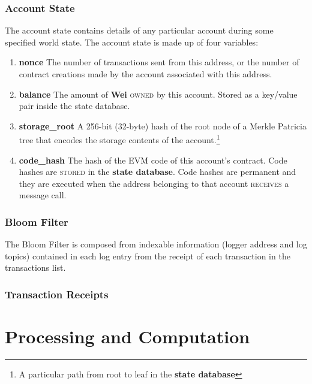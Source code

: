 \documentclass[10pt,a4paper,leqno,bibliography=totoc]{scrartcl}
\newenvironment{alphafootnotes}
{\par\edef\savedfootnotenumber{\number\value{footnote}}
\renewcommand{\thefootnote}{\alph{footnote}}
\setcounter{footnote}{0}}
{\par\setcounter{footnote}{\savedfootnotenumber}}
\begin{document}
\begin{alphafootnotes}
\begin{multicols*}{2}
					\subsubsection{Account State}
				The account state contains details of any particular account during some specified world state. The account state is made up of four variables:
				\begin{enumerate}
					\item \textbf{nonce} The number of transactions sent from this address, or the number of contract creations made by the account associated with this address.
					\item \textbf{balance} The amount of \textbf{Wei} \textsc{owned} by this account. Stored as a key/value pair inside the state database. 
					\item \textbf{storage\_root} A 256-bit (32-byte) hash of the root node of a Merkle Patricia tree that encodes the storage contents of the account.\footnote{A particular path from root to leaf in the \textbf{\gls{state database}}} 
					\item \textbf{code\_hash} The hash of the EVM code of this account's contract. Code hashes are \textsc{stored} in the \textbf{\gls{state database}}. Code hashes are permanent and they are executed when the address belonging to that account \textsc{receives} a message call.

				\end{enumerate}

    					\subsubsection{Bloom Filter}
				The Bloom Filter is composed from indexable information (logger address and log topics) contained in each log entry from the receipt of each transaction in the transactions list. 

					\subsubsection{Transaction Receipts}


		\section{Processing and Computation}
	

\end{multicols*}
\end{alphafootnotes}
\end{document}
